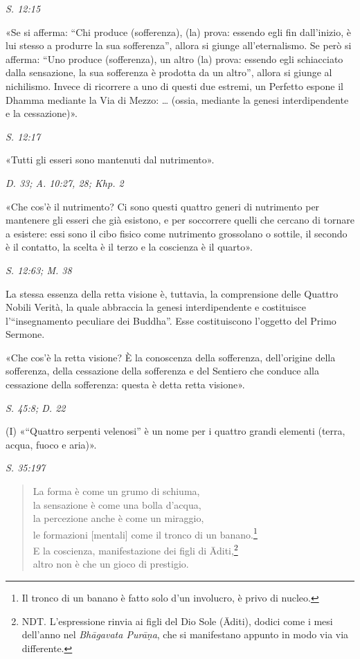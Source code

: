 \emph{S. 12:15}


«Se si afferma: “Chi produce (sofferenza), (la) prova: essendo egli fin
dall’inizio, è lui stesso a produrre la sua sofferenza”, allora si
giunge all’eternalismo. Se però si afferma: “Uno produce (sofferenza),
un altro (la) prova: essendo egli schiacciato dalla sensazione, la sua
sofferenza è prodotta da un altro”, allora si giunge al nichilismo.
Invece di ricorrere a uno di questi due estremi, un Perfetto espone il
Dhamma mediante la Via di Mezzo: … (ossia, mediante la genesi
interdipendente e la cessazione)».


\emph{S. 12:17}


«Tutti gli esseri sono mantenuti dal nutrimento».


\emph{D. 33; A. 10:27, 28; Khp. 2}


«Che cos’è il nutrimento? Ci sono questi quattro generi di nutrimento
per mantenere gli esseri che già esistono, e per soccorrere quelli che
cercano di tornare a esistere: essi sono il cibo fisico come nutrimento
grossolano o sottile, il secondo è il contatto, la scelta è il terzo e
la coscienza è il quarto».


\emph{S. 12:63; M. 38}


 La stessa essenza della retta visione è, tuttavia, la
comprensione delle Quattro Nobili Verità, la quale abbraccia la genesi
interdipendente e costituisce l’“insegnamento peculiare dei Buddha”.
Esse costituiscono l’oggetto del Primo Sermone.


 «Che cos’è la retta visione? È la conoscenza della
sofferenza, dell’origine della sofferenza, della cessazione della
sofferenza e del Sentiero che conduce alla cessazione della sofferenza:
questa è detta retta visione».


\emph{S. 45:8; D. 22}


(I) «“Quattro serpenti velenosi” è un nome per i quattro grandi
elementi (terra, acqua, fuoco e aria)».


\emph{S. 35:197}


\begin{quote}
La forma è come un grumo di schiuma, \\
la sensazione è come una bolla d’acqua, \\
la percezione anche è come un miraggio, \\
le formazioni [mentali] come il tronco di un banano.\footnote{Il tronco di un banano è fatto solo d’un involucro, è privo di nucleo.} \\
E la coscienza, manifestazione dei figli di Āditi,\footnote{NDT. L’espressione rinvia ai figli del Dio Sole (Āditi), dodici come i mesi dell’anno nel \emph{Bhāgavata Purāṇa}, che si manifestano appunto in modo via via differente.} \\
altro non è che un gioco di prestigio.
\end{quote}

